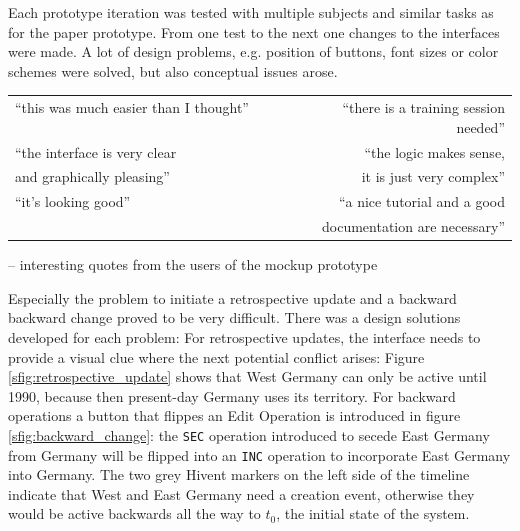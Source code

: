 Each prototype iteration was tested with multiple subjects and similar tasks as for the paper prototype. From one test to the next one changes to the interfaces were made. A lot of design problems, e.g. position of buttons, font sizes or color schemes were solved, but also conceptual issues arose.

\begin{quoteit}
  \begin{tabular}{l r}
    ``this was much easier than I thought'' ~~~~~~~~ &
    ``there is a training session needed'' \\[0.5em]
    ``the interface is very clear &
    ``the logic makes sense, \\
    and graphically pleasing'' &
    it is just very complex'' \\[0.5em]
    ``it's looking good'' &
    ``a nice tutorial and a good \\
    & documentation are necessary'' \\
  \end{tabular}
\end{quoteit}
\vspace{-1em}
\hfill -- interesting quotes from the users of the mockup prototype

Especially the problem to initiate a retrospective update and a backward backward change proved to be very difficult. There was a design solutions developed for each problem: For retrospective updates, the interface needs to provide a visual clue where the next potential conflict arises: Figure \ref{sfig:retrospective_update} shows that West Germany can only be active until 1990, because then present-day Germany uses its territory. For backward operations a button that flippes an Edit Operation  is introduced in figure \ref{sfig:backward_change}: the \texttt{SEC} operation introduced to secede East Germany from Germany will be flipped into an \texttt{INC} operation to incorporate East Germany into Germany. The two grey Hivent markers on the left side of the timeline indicate that West and East Germany need a creation event, otherwise they would be active backwards all the way to $t_0$, the initial state of the system.

